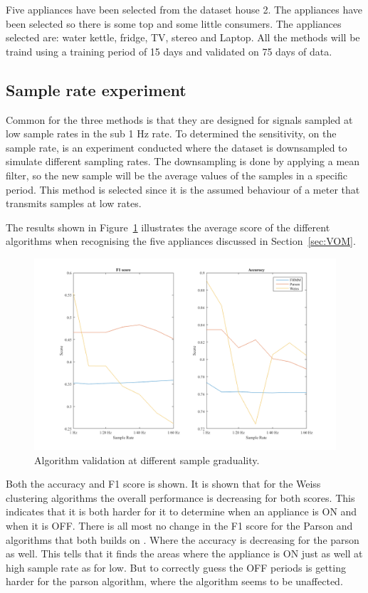 Five appliances have been selected from the  dataset house 2. The appliances have been selected so there is some top and some little consumers. The appliances selected are: water kettle, fridge, TV, stereo and Laptop. All the methods will be traind using a training period of 15 days and validated on 75 days of data. 

\subsection{Sample rate experiment}
Common for the three methods is that they are designed for signals sampled at low sample rates in the sub 1 Hz rate. To determined the sensitivity, on the sample rate, is an experiment conducted where the dataset is downsampled to simulate different sampling rates. The downsampling is done by applying a mean filter, so the new sample will be the average values of the samples in a specific period. This method is selected since it is the assumed behaviour of a meter that transmits samples at low rates. 

The results shown in Figure~\ref{fig:DSE} illustrates the average score of the different algorithms when recognising the five appliances discussed in Section~\ref{sec:VOM}. 

\begin{figure}[H]
\centering
\includegraphics[width=1\textwidth]{billeder/AlgoScoreNilm.png}
\caption{Algorithm validation at different sample graduality.}
\label{fig:DSE}
\end{figure}

Both the accuracy and F1 score is shown. It is shown that for the Weiss clustering algorithms the overall performance is decreasing for both scores. This indicates that it is both harder for it to determine when an appliance is ON and when it is OFF. There is all most no change in the F1 score for the Parson and  algorithms that both builds on . Where the accuracy is decreasing for the parson as well. This tells that it finds the areas where the appliance is ON just as well at high sample rate as for low. But to correctly guess the OFF periods is getting harder for the parson algorithm, where the  algorithm seems to be unaffected. 

